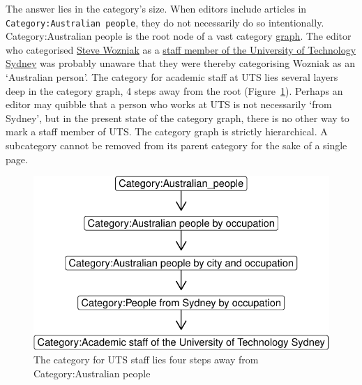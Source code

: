 \documentclass[
  a4paper,
  DIV=11,
  numbers=noendperiod]{scrreprt}
\begin{document}
The answer lies in the category's size. When editors include articles in
\texttt{Category:Australian\ people}, they do not necessarily do so
intentionally. Category:Australian people is the root node of a vast
category
\href{https://en.wikipedia.org/wiki/Graph_(discrete_mathematics)}{graph}.
The editor who categorised
\href{https://en.wikipedia.org/wiki/Steve_Wozniak}{Steve Wozniak} as a
\href{https://en.wikipedia.org/wiki/Category:Academic_staff_of_the_University_of_Technology_Sydney}{staff
member of the University of Technology Sydney} was probably unaware that
they were thereby categorising Wozniak as an `Australian person'. The
category for academic staff at UTS lies several layers deep in the
category graph, 4 steps away from the root
(Figure~\ref{fig-wozniak-distance-from-oz}). Perhaps an editor may
quibble that a person who works at UTS is not necessarily `from Sydney',
but in the present state of the category graph, there is no other way to
mark a staff member of UTS. The category graph is strictly hierarchical.
A subcategory cannot be removed from its parent category for the sake of
a single page.

\begin{figure}

{\centering \includegraphics{who-counts_files/figure-pdf/fig-wozniak-distance-from-oz-1.pdf}

}

\caption{\label{fig-wozniak-distance-from-oz}The category for UTS staff
lies four steps away from Category:Australian people}

\end{figure}
\end{document}
